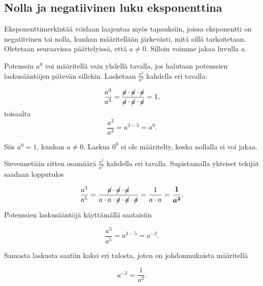 \subsection{Nolla ja negatiivinen luku eksponenttina}

Eksponenttimerkintää voidaan laajentaa myös tapauksiin, joissa eksponentti on negatiivinen tai nolla, kunhan määritellään järkevästi, mitä sillä tarkoitetaan. Oletetaan seuraavissa päättelyissä, että $a \neq 0$. Silloin voimme jakaa luvulla $a$.

Potenssin $a^0$ voi määritellä vain yhdellä tavalla, jos halutaan potenssien laskusääntöjen pätevän sillekin. Lasketaan $\frac{a^3}{a^3}$ kahdella eri tavalla:

    \[
        \frac{a^3}{a^3}=\frac{\cancel{a}\cdot \cancel{a}\cdot \cancel{a}}
        {\cancel{a}\cdot \cancel{a}\cdot \cancel{a}}=1,
    \]
	toisaalta
 \[ \frac{a^3}{a^3}=a^{3-3}=a^0. \]

Siis $a^0=1$, kunhan $a\neq 0$. Laskua $0^0$ ei ole määritelty, koska nollalla ei voi jakaa. 
 
  
    
    \begin{esimerkki}
    \end{esimerkki}    
    
Sievennetään sitten osamäärä $\frac{a^3}{a^5}$ kahdella eri tavalla. Supistamalla yhteiset tekijät saadaan lopputulos
    
    \begin{equation*}
        \frac{a^3}{a^5} =
        \frac{\cancel{a}\cdot \cancel{a}\cdot \cancel{a}}{a\cdot a\cdot
        \cancel{a}\cdot \cancel{a}\cdot \cancel{a}} = 
        \frac{1}{a\cdot a}=\boldsymbol{\frac{1}{a^2}}.
    \end{equation*}
    
Potenssien laskusääntöjä käyttämällä saataisiin
    
    \begin{equation*}
        \frac{a^3}{a^5} = a^{3-5}= a^{-2}.
    \end{equation*}
    
Samasta laskusta saatiin kaksi eri tulosta, joten on johdonmukaista määritellä
    
    \begin{equation*}
        a^{-2} = \frac{1}{a^2}.
    \end{equation*}

